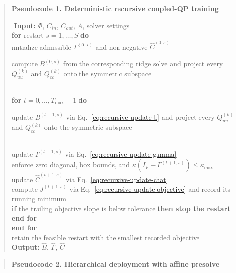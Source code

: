 \documentclass[a4paper,fleqn]{cas-sc}
\DeclareRobustCommand{\currentrev}[1]{{\color{currentRevisionBlue}#1}}
\DeclareRobustCommand{\currentrev}[1]{#1}
\newenvironment{revblock}{}{}
\newenvironment{revblockr127}{}{}
\begin{document}
\begin{revblock}
\begin{revblockr127}
\noindent\begin{minipage}{\textwidth}
\begin{quote}
\noindent\textbf{Pseudocode 1. Deterministic recursive coupled-QP training}
\begin{tabbing}
\hspace{0.6cm}\=\hspace{0.6cm}\=\hspace{0.6cm}\=\kill
\textbf{Input:} $\Phi$, $C_{in}$, $C_{out}$, $A$, solver settings \\
\textbf{for} restart $s = 1, \dots, S$ \textbf{do} \\
\> initialize admissible $\Gamma^{(0,s)}$ and non-negative $\widehat{C}^{(0,s)}$ \\
\> \parbox[t]{0.84\linewidth}{\currentrev{compute $B^{(0,s)}$ from the corresponding ridge solve and project every $Q_{uu}^{(k)}$ and $Q_{cc}^{(k)}$ onto the symmetric subspace}} \\
\> \textbf{for} $t = 0, \dots, T_{\max}-1$ \textbf{do} \\
\>\> \parbox[t]{0.80\linewidth}{\currentrev{update $B^{(t+1,s)}$ via Eq.~\eqref{eq:recursive-update-b} and project every $Q_{uu}^{(k)}$ and $Q_{cc}^{(k)}$ onto the symmetric subspace}} \\
\>\> update $\Gamma^{(t+1,s)}$ via Eq.~\eqref{eq:recursive-update-gamma} \\
\>\> enforce zero diagonal, box bounds, and $\kappa(I_F - \Gamma^{(t+1,s)}) \le \kappa_{\max}$ \\
\>\> update $\widehat{C}^{(t+1,s)}$ via Eq.~\eqref{eq:recursive-update-chat} \\
\>\> compute $J^{(t+1,s)}$ via Eq.~\eqref{eq:recursive-update-objective} and record its running minimum \\
\>\> \textbf{if} the trailing objective slope is below tolerance \textbf{then stop the restart} \\
\> \textbf{end for} \\
\textbf{end for} \\
retain the feasible restart with the smallest recorded objective \\
\textbf{Output:} $\widehat{B}$, $\widehat{\Gamma}$, $\widehat{C}$
\end{tabbing}
\end{quote}
\par\medskip
\begin{quote}
\noindent\textbf{Pseudocode 2. Hierarchical deployment with affine presolve}
\begin{tabbing}

\end{tabbing}
\end{quote}
\end{minipage}
\end{revblockr127}
\end{revblock}
\end{document}
